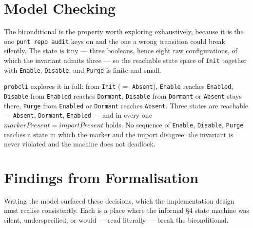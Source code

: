 \documentclass[a4paper,10pt,fleqn]{article}
\begin{document}
\section{Model Checking}
\label{sec:modelcheck}

The biconditional is the property worth exploring exhaustively, because it is
the one \texttt{punt repo audit} keys on and the one a wrong transition could break
silently. The state is tiny --- three booleans, hence eight raw configurations,
of which the invariant admits three --- so the reachable state space of
\texttt{Init} together with \texttt{Enable}, \texttt{Disable}, and \texttt{Purge}
is finite and small.

\texttt{probcli} explores it in full: from \texttt{Init} ($=$ \texttt{Absent}),
\texttt{Enable} reaches \texttt{Enabled}, \texttt{Disable} from \texttt{Enabled}
reaches \texttt{Dormant}, \texttt{Disable} from \texttt{Dormant} or
\texttt{Absent} stays there, \texttt{Purge} from \texttt{Enabled} or
\texttt{Dormant} reaches \texttt{Absent}. Three states are reachable ---
\texttt{Absent}, \texttt{Dormant}, \texttt{Enabled} --- and in every one
$markerPresent = importPresent$ holds. No sequence of \texttt{Enable},
\texttt{Disable}, \texttt{Purge} reaches a state in which the marker and the
import disagree; the invariant is never violated and the machine does not
deadlock.

\section{Findings from Formalisation}
\label{sec:findings}

Writing the model surfaced these decisions, which the implementation design must
realise consistently. Each is a place where the informal \S4 state machine was
silent, underspecified, or would --- read literally --- break the biconditional.
\end{document}
